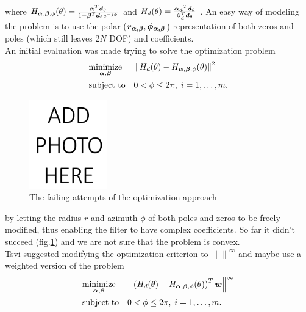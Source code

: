 \documentclass[12pt]{article}
\begin{document}
where 
$ 
H_{\boldsymbol{\alpha},\boldsymbol{\beta},\phi}(\theta) =  
\frac
{
\boldsymbol{\alpha}^{T}
\boldsymbol{d}_{\theta}
}
{
1
-
\boldsymbol{\beta}^{T}\boldsymbol{d}_{\theta}
e^{-j\phi}
}
$
and 
$ 
H_{d}(\theta) =  
\frac
{
\boldsymbol{\alpha_{d}}^{T}
\boldsymbol{d}_{\theta}
}
{
\boldsymbol{\beta}_{d}^{T}\boldsymbol{d}_{\theta}
}
$
. 
An easy way of modeling the problem is to use the polar ($\boldsymbol{r_{\boldsymbol{\alpha},\boldsymbol{\beta}}},\boldsymbol{\phi_{\boldsymbol{\alpha},\boldsymbol{\beta}}}$) representation of both zeros and poles (which still leaves $ 2N $ DOF) and coefficients.
\\
An initial evaluation was made trying to solve the optimization problem 
\begin{equation*}
\begin{aligned}
& \underset{\boldsymbol{\alpha},\boldsymbol{\beta}}{\text{minimize}}
& & 
\left\lVert 
H_{d}(\theta) - H_{\boldsymbol{\alpha},\boldsymbol{\beta},\phi}(\theta)
\right\rVert^2
\\
& \text{subject to}
& & 0 < \phi \leq 2\pi, \; i = 1, \ldots, m.
\end{aligned}
\end{equation*}
\begin{figure}[!ht]
\begin{center}
\includegraphics[width=0.3\textwidth]{Media/addPhotoHere.PNG}
\caption
{
The failing attempts of the optimization approach
}
\label{fig:filtOptimizationFail}
\end{center}
\end{figure}
by letting the radius $ r $ and azimuth $ \phi $ of both poles and zeros to be freely modified, thus enabling the filter to have complex coefficients. So far it didn't succeed (fig.\ref{fig:filtOptimizationFail}) and we are not sure that the problem is convex.
\\
Tsvi suggested modifying the optimization criterion to $ \left\lVert \right\rVert^\infty $ and maybe use a weighted version of the problem 
\begin{equation*}
\begin{aligned}
& \underset{\boldsymbol{\alpha},\boldsymbol{\beta}}{\text{minimize}}
& & 
\left\lVert 
\left(H_{d}(\theta) - H_{\boldsymbol{\alpha},\boldsymbol{\beta},\phi}(\theta)\right)^{T}\boldsymbol{w}
\right\rVert^\infty
\\
& \text{subject to}
& & 0 < \phi \leq 2\pi, \; i = 1, \ldots, m.
\end{aligned}
\end{equation*}
\end{document}
